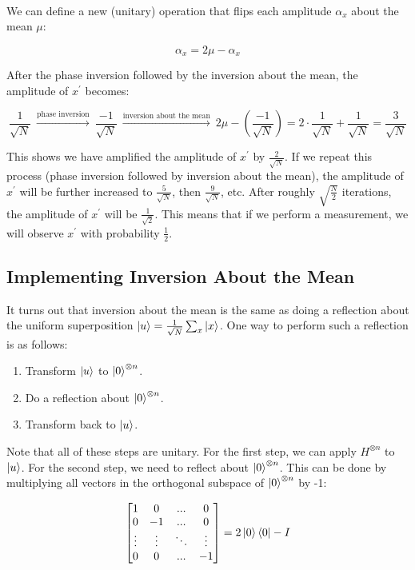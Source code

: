 \documentclass[12pt]{article}
\begin{document}
\noindent
\\
We can define a new (unitary) operation that flips each amplitude $\alpha_x$ about the mean $\mu$:

\[ \alpha_x = 2\mu - \alpha_x \]

\noindent
After the phase inversion followed by the inversion about the mean, the amplitude of $x^\prime$ becomes:

\[ \frac{1}{\sqrt{N}} \ \stackrel{\text{phase inversion}}{\longrightarrow} \ \frac{-1}{\sqrt{N}} \ \stackrel{\text{inversion about the mean}}{\longrightarrow} \ 2\mu - \left(\frac{-1}{\sqrt{N}}\right) = 2 \cdot \frac{1}{\sqrt{N}} + \frac{1}{\sqrt{N}} = \frac{3}{\sqrt{N}} \]

\noindent
This shows we have amplified the amplitude of $x^\prime$ by $\frac{2}{\sqrt{N}}$.
If we repeat this process (phase inversion followed by inversion about the mean), the amplitude of $x^\prime$ will be further increased to $\frac{5}{\sqrt{N}}$, then $\frac{9}{\sqrt{N}}$, etc.
After roughly $\sqrt{\frac{N}{2}}$ iterations, the amplitude of $x^\prime$ will be $\frac{1}{\sqrt{2}}$.
This means that if we perform a measurement, we will observe $x^\prime$ with probability $\frac{1}{2}$.

\newpage
\subsection*{Implementing Inversion About the Mean}
It turns out that inversion about the mean is the same as doing a reflection about the uniform superposition $\ket{u} = \frac{1}{\sqrt{N}} \sum_x \ket{x}$.
One way to perform such a reflection is as follows:

\begin{enumerate}
    \item Transform $\ket{u}$ to $\ket{0}^{\otimes n}$.
    \item Do a reflection about $\ket{0}^{\otimes n}$.
    \item Transform back to $\ket{u}$.
\end{enumerate}

\noindent
Note that all of these steps are unitary.
For the first step, we can apply $H^{\otimes n}$ to $\ket{u}$.
For the second step, we need to reflect about $\ket{0}^{\otimes n}$.
This can be done by multiplying all vectors in the orthogonal subspace of $\ket{0}^{\otimes n}$ by -1:

\[ \begin{bmatrix}
    1 & 0 & ... & 0 \\
    0 & -1 & ... & 0 \\
    \vdots & \vdots & \ddots & \vdots \\
    0 & 0 & ... & -1
\end{bmatrix} = 2\ket{0}\bra{0} - I \] 
\end{document}
